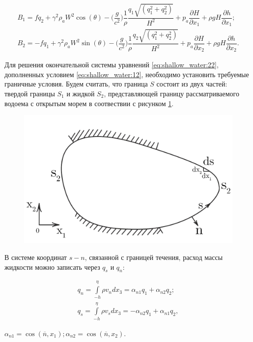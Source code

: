 \documentclass[14pt]{extreport}
\begin{document}

\begin{equation*}
\begin{aligned}
B_1=fq_2+\gamma^2\rho_aW^2\cos(\theta)-\bigg(\dfrac{g}{c^2}\bigg)\dfrac{1}{\rho}\dfrac{q_1\sqrt{(q_1^2+q_2^2)}}{H^2} + p_a \dfrac{\partial H}{\partial x_1} + \rho gH\dfrac{\partial h}{\partial x_1}; \\
B_2=-fq_1+\gamma^2\rho_aW^2\sin(\theta)-\bigg(\dfrac{g}{c^2}\bigg)\dfrac{1}{\rho}\dfrac{q_2\sqrt{(q_1^2+q_2^2)}}{H^2} + p_a \dfrac{\partial H}{\partial x_2} + \rho gH\dfrac{\partial h}{\partial x_2}.
\end{aligned}
\end{equation*}

Для решения окончательной системы уравнений \ref{eq:shallow_water:22}, дополненных условием \ref{eq:shallow_water:12}, необходимо установить требуемые граничные условия. Будем считать, что граница $S$ состоит из двух частей: твердой границы $S_1$ и жидкой $S_2$, представляющей границу рассматриваемого водоема с открытым морем в соотвествии с рисунком \ref{img:shallow_water:3}.

\begin{figure}[H]
\centerline{\includegraphics[width=0.5\linewidth]{images/shallow_water_3}}
\caption{}
\label{img:shallow_water:3}
\end{figure}

В системе координат $s-n$, связанной с границей течения, расход массы жидкости можно записать через $q_s$ и $q_n$:

\begin{equation}\label{eq:shallow_water:24}
\begin{aligned}
q_n=\int\limits^\eta_{-h} \rho v_n dx_3= \alpha_{n1}q_1+\alpha_{n2}q_2; \\
q_s=\int\limits^\eta_{-h} \rho v_s dx_3= -\alpha_{n2}q_1+\alpha_{n1}q_2,
\end{aligned}
\end{equation}

 $\alpha_{n1}=\cos(\overline{n},x_1); \alpha_{n2}=\cos(\overline{n},x_2).$
\end{document}
